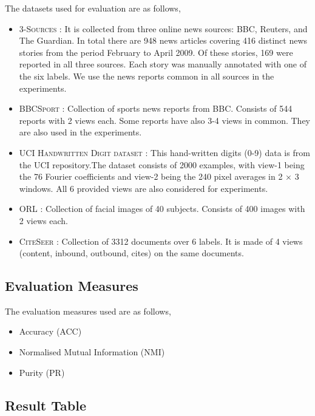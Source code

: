 \documentclass[a4paper]{article}
\begin{document}
	The datasets used for evaluation are as follows,
	\begin{itemize}
	\item \textsc{3-Sources} : It is collected from three online news sources: BBC, Reuters, and The Guardian. In total there are 948 news articles covering 416 distinct news stories from the period February to April 2009. Of these stories, 169 were reported in all three sources. Each story was manually annotated with one of the six labels. We use the news reports common in all sources in the experiments.
	\item \textsc{BBCSport} : Collection of sports news reports from BBC. Consists of 544 reports with 2 views each. Some reports have also 3-4 views in common. They are also used in the experiments.
	\item \textsc{UCI Handwritten Digit dataset} : This hand-written digits (0-9) data is from the UCI repository.The dataset consists of 2000 examples, with view-1 being the 76 Fourier coefficients and view-2 being the 240 pixel averages in 2 × 3 windows. All 6 provided views are also considered for experiments.
	\item \textsc{ORL} : Collection of facial images of 40 subjects. Consists of 400 images with 2 views each.
	\item \textsc{CiteSeer} : Collection of 3312 documents over 6 labels. It is made of 4 views (content, inbound, outbound, cites) on the same documents.
	\end{itemize}

	\subsection{Evaluation Measures}

	The evaluation measures used are as follows,
	\begin{itemize}
	\item {Accuracy (ACC)}
	\item {Normalised Mutual Information (NMI)}
	\item {Purity (PR)}
	\end{itemize}
	

	\subsection{Result Table}	
\end{document}
